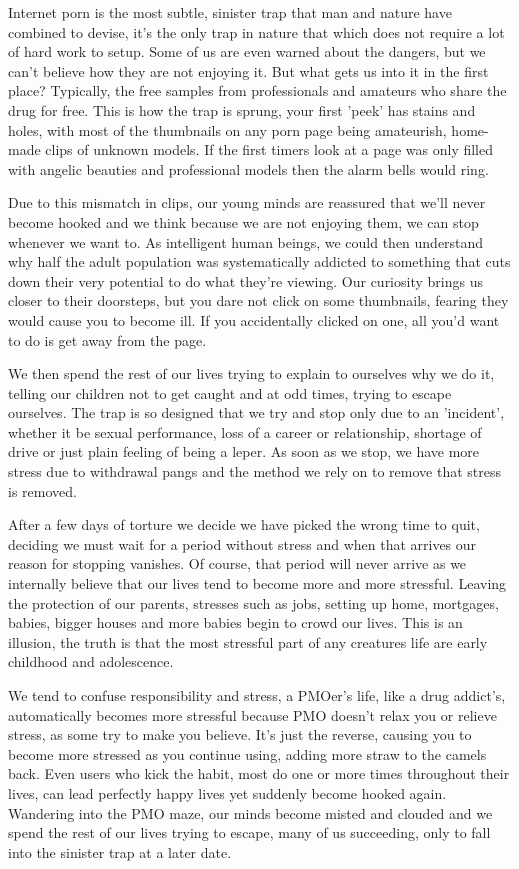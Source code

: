\documentclass[easypeasy.tex]{subfiles}
\begin{document}
Internet porn is the most subtle, sinister trap that man and nature have combined to devise, it's the only trap in nature that which does not require a lot of hard work to setup. Some of us are even warned about the dangers, but we can't believe how they are not enjoying it. But what gets us into it in the first place? Typically, the free samples from professionals and amateurs who share the drug for free. This is how the trap is sprung, your first 'peek' has stains and holes, with most of the thumbnails on any porn page being amateurish, home-made clips of unknown models. If the first timers look at a page was only filled with angelic beauties and professional models then the alarm bells would ring.

Due to this mismatch in clips, our young minds are reassured that we'll never become hooked and we think because we are not enjoying them, we can stop whenever we want to. As intelligent human beings, we could then understand why half the adult population was systematically addicted to something that cuts down their very potential to do what they're viewing. Our curiosity brings us closer to their doorsteps, but you dare not click on some thumbnails, fearing they would cause you to become ill. If you accidentally clicked on one, all you'd want to do is get away from the page.

We then spend the rest of our lives trying to explain to ourselves why we do it, telling our children not to get caught and at odd times, trying to escape ourselves. The trap is so designed that we try and stop only due to an 'incident', whether it be sexual performance, loss of a career or relationship, shortage of drive or just plain feeling of being a leper. As soon as we stop, we have more stress due to withdrawal pangs and the method we rely on to remove that stress is removed.

After a few days of torture we decide we have picked the wrong time to quit, deciding we must wait for a period without stress and when that arrives our reason for stopping vanishes. Of course, that period will never arrive as we internally believe that our lives tend to become more and more stressful. Leaving the protection of our parents, stresses such as jobs, setting up home, mortgages, babies, bigger houses and more babies begin to crowd our lives. This is an illusion, the truth is that the most stressful part of any creatures life are early childhood and adolescence.

We tend to confuse responsibility and stress, a PMOer's life, like a drug addict's, automatically becomes more stressful because PMO doesn't relax you or relieve stress, as some try to make you believe. It's just the reverse, causing you to become more stressed as you continue using, adding more straw to the camels back. Even users who kick the habit, most do one or more times throughout their lives, can lead perfectly happy lives yet suddenly become hooked again. Wandering into the PMO maze, our minds become misted and clouded and we spend the rest of our lives trying to escape, many of us succeeding, only to fall into the sinister trap at a later date.
\end{document}
